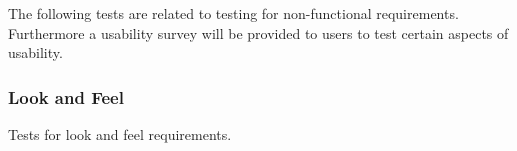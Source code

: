 \documentclass[12pt, titlepage]{article}
\begin{document}


The following tests are related to testing for non-functional requirements. Furthermore a usability survey will be provided to users to test certain aspects of usability.

\subsubsection{Look and Feel}
Tests for look and feel requirements.
\end{document}
